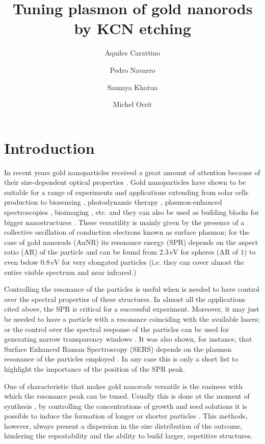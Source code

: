\documentclass[twocolumn]{article}
\title{Tuning plasmon of gold nanorods by KCN etching}
\author{Aquiles Carattino \and Pedro Navarro \and Saumya Khatua \and Michel
Orrit}
\begin{document}
\maketitle
{}

\section{Introduction}
In recent years gold nanoparticles received a great amount of attention because
of their size-dependent optical properties \cite{Zijlstra2011}. Gold
nanoparticles have shown to be suitable for a range of experiments and
applications extending from solar cells production \cite{Catchpole2008} to
biosensing \cite{Zijlstra2012}, photodynamic therapy \cite{Zhao2014},
plasmon-enhanced spectroscopies \cite{Sivapalan2013}, bioimaging
\cite{VandenBroek2013}, etc. and they can also be used as building blocks for
bigger nanostructures \cite{Ivanov2011} \cite{Do2013} \cite{Guffey2011}. These
versatility is mainly given by the presence of a collective oscillation of
conduction electrons known as surface plasmon; for the case of gold nanorods
(AuNR) its resonance energy (SPR) depends on the aspect ratio (AR) of the
particle and can be found from $2.3\,\textrm{eV}$ for spheres (AR of $1$) to even below
$0.8\,\textrm{eV}$ for very elongated particles (i.e. they can cover almost the entire
visible spectrum and near infrared.) 

Controlling the resonance of the particles is useful when is needed to have
control over the spectral properties of these structures. In almost all the
applications cited above, the SPR is critical for a successful experiment.
Moreover, it may just be needed to have a particle with a resonance coinciding
with the available lasers; or the control over the spectral response of the
particles can be used for generating narrow transparency windows
\cite{Biswas2013}. It was also shown, for instance, that Surface Enhanced Raman
Spectroscopy (SERS) depends on the plasmon resonance of the particles employed
\cite{Sivapalan2013}. In any case this is only a short list to highlight the
importance of the position of the SPR peak.

One of characteristic that makes gold nanorods versatile is the easiness with
which the resonance peak can be tuned. Usually this is done at the moment of
synthesis \cite{Gou2005}, by controlling the concentrations of growth and seed
solutions it is possible to induce the formation of longer or shorter particles
\cite{Nikoobakht2003}. This methods, however, always present a dispersion in the
size distribution of the outcome, hindering the repeatability and the ability to
build larger, repetitive structures.
\end{document}
